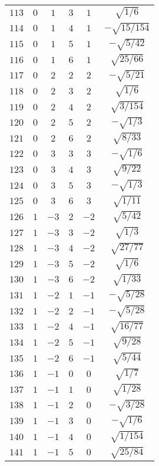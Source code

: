 \begin{table}
\begin{center}
\begin{tabular}{|c|c|c|c|c|c|}
$113$ & $0$ & $1$ & $3$ & $1$ & $\sqrt{1/6}$ \\ 
$114$ & $0$ & $1$ & $4$ & $1$ & $-\sqrt{15/154}$ \\ 
$115$ & $0$ & $1$ & $5$ & $1$ & $-\sqrt{5/42}$ \\ 
$116$ & $0$ & $1$ & $6$ & $1$ & $\sqrt{25/66}$ \\ 
$117$ & $0$ & $2$ & $2$ & $2$ & $-\sqrt{5/21}$ \\ 
$118$ & $0$ & $2$ & $3$ & $2$ & $\sqrt{1/6}$ \\ 
$119$ & $0$ & $2$ & $4$ & $2$ & $\sqrt{3/154}$ \\ 
$120$ & $0$ & $2$ & $5$ & $2$ & $-\sqrt{1/3}$ \\ 
$121$ & $0$ & $2$ & $6$ & $2$ & $\sqrt{8/33}$ \\ 
$122$ & $0$ & $3$ & $3$ & $3$ & $-\sqrt{1/6}$ \\ 
$123$ & $0$ & $3$ & $4$ & $3$ & $\sqrt{9/22}$ \\ 
$124$ & $0$ & $3$ & $5$ & $3$ & $-\sqrt{1/3}$ \\ 
$125$ & $0$ & $3$ & $6$ & $3$ & $\sqrt{1/11}$ \\ 
$126$ & $1$ & $-3$ & $2$ & $-2$ & $\sqrt{5/42}$ \\ 
$127$ & $1$ & $-3$ & $3$ & $-2$ & $\sqrt{1/3}$ \\ 
$128$ & $1$ & $-3$ & $4$ & $-2$ & $\sqrt{27/77}$ \\ 
$129$ & $1$ & $-3$ & $5$ & $-2$ & $\sqrt{1/6}$ \\ 
$130$ & $1$ & $-3$ & $6$ & $-2$ & $\sqrt{1/33}$ \\ 
$131$ & $1$ & $-2$ & $1$ & $-1$ & $-\sqrt{5/28}$ \\ 
$132$ & $1$ & $-2$ & $2$ & $-1$ & $-\sqrt{5/28}$ \\ 
$133$ & $1$ & $-2$ & $4$ & $-1$ & $\sqrt{16/77}$ \\ 
$134$ & $1$ & $-2$ & $5$ & $-1$ & $\sqrt{9/28}$ \\ 
$135$ & $1$ & $-2$ & $6$ & $-1$ & $\sqrt{5/44}$ \\ 
$136$ & $1$ & $-1$ & $0$ & $0$ & $\sqrt{1/7}$ \\ 
$137$ & $1$ & $-1$ & $1$ & $0$ & $\sqrt{1/28}$ \\ 
$138$ & $1$ & $-1$ & $2$ & $0$ & $-\sqrt{3/28}$ \\ 
$139$ & $1$ & $-1$ & $3$ & $0$ & $-\sqrt{1/6}$ \\ 
$140$ & $1$ & $-1$ & $4$ & $0$ & $\sqrt{1/154}$ \\ 
$141$ & $1$ & $-1$ & $5$ & $0$ & $\sqrt{25/84}$ \\ 

\end{tabular}
\end{center}
\end{table}

